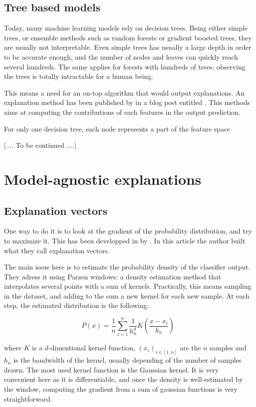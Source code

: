 \documentclass[a4paper,11pt]{kth-mag}
\begin{document}
\subsection{Tree based models}

Today, many machine learning models rely on decision trees. Being either simple trees, or ensemble methods such as random forests or gradient boosted trees, they are usually not interpretable. Even simple trees has usually a large depth in order to be accurate enough, and the number of nodes and leaves can quickly reach several hundreds. The same applies for forests with hundreds of trees: observing the trees is totally intractable for a human being.

This means a need for an on-top algorithm that would output explanations. An explanation method has been published by \citeauthor{treeinterpreter} in a blog post entitled . This methods aims at computing the contributions of each features in the output prediction.

For only one decision tree, each node represents a part of the feature space


[.... To be continued ....]

\section{Model-agnostic explanations}

\subsection{Explanation vectors}

One way to do it is to look at the gradient of the probability distribution, and try to maximize it. This has been developped in  by \citeauthor{explvect}. In this article the author built what they call explanation vectors.

The main issue here is to estimate the probability density of the classifier output. They adress it using Parzen windows: a density estimation method that interpolates several points with a sum of kernels. Practically, this means sampling in the dataset, and adding to the sum a new kernel for each new sample. At each step, the estimated distribution is the following:

\[
	P(x) = \frac{1}{n} \sum_{i=1}^n \frac1{h_n^d} K \left( \frac{x - x_i}{h_n} \right)
\]

where $K$ is a $d$-dimentional kernel function, $(x_i)_{i \in [1,n]}$ are the $n$ samples and $h_n$ is the bandwidth of the kernel, usually depending of the number of samples drawn. The most used kernel function is the Gaussian kernel. It is very convenient here as it is differentiable, and once the density is well-estimated by the window, computing the gradient from a sum of gaussian functions is very straightforward.
\end{document}
